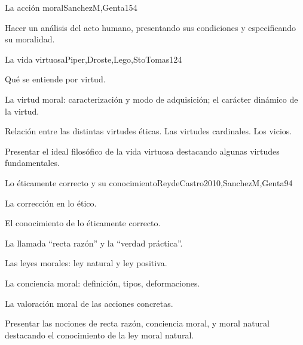 \begin{syllabus}
\begin{unit}{La acción moral}{SanchezM,Genta}{15}{4}
\begin{topics}
\end{topics}
\begin{unitgoals}
	\item Hacer un análisis del acto humano, presentando sus condiciones y especificando su moralidad.
\end{unitgoals}
\end{unit}

\begin{unit}{La vida virtuosa}{Piper,Droste,Lego,StoTomas}{12}{4}
\begin{topics}
	\item	Qué se entiende por virtud.
	\item	La virtud moral: caracterización y modo de adquisición; el carácter dinámico de la virtud.
	\item	Relación entre las distintas virtudes éticas. Las virtudes cardinales. Los vicios.

\end{topics}
\begin{unitgoals}
	\item Presentar el ideal filosófico de la vida virtuosa destacando algunas virtudes fundamentales.
\end{unitgoals}
\end{unit}

\begin{unit}{Lo éticamente correcto y su conocimiento}{ReydeCastro2010,SanchezM,Genta}{9}{4}
\begin{topics}
	\item 	La corrección en lo ético.
	\item 	El conocimiento de lo éticamente correcto.
	\item 	La llamada ``recta razón'' y la ``verdad práctica''. 
	\item 	Las leyes morales: ley natural y ley positiva.
	\item 	La conciencia moral: definición, tipos, deformaciones. 
	\item 	La valoración moral de las acciones concretas.

\end{topics}

\begin{unitgoals}
	\item Presentar las nociones de recta razón, conciencia moral, y moral natural destacando el conocimiento de la ley moral natural.
\end{unitgoals}
\end{unit}



\begin{coursebibliography}
\end{coursebibliography}

\end{syllabus}
